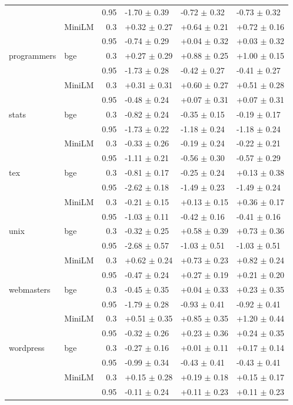\begin{tabular}{llrlll}
 &  & 0.95 & -1.70 $\pm$ 0.39 & -0.72 $\pm$ 0.32 & -0.73 $\pm$ 0.32\\
 & MiniLM & 0.3 & +0.32 $\pm$ 0.27 & +0.64 $\pm$ 0.21 & +0.72 $\pm$ 0.16\\
 &  & 0.95 & -0.74 $\pm$ 0.29 & +0.04 $\pm$ 0.32 & +0.03 $\pm$ 0.32\\
\addlinespace[1pt]
programmers & bge & 0.3 & +0.27 $\pm$ 0.29 & +0.88 $\pm$ 0.25 & +1.00 $\pm$ 0.15\\
 &  & 0.95 & -1.73 $\pm$ 0.28 & -0.42 $\pm$ 0.27 & -0.41 $\pm$ 0.27\\
 & MiniLM & 0.3 & +0.31 $\pm$ 0.31 & +0.60 $\pm$ 0.27 & +0.51 $\pm$ 0.28\\
 &  & 0.95 & -0.48 $\pm$ 0.24 & +0.07 $\pm$ 0.31 & +0.07 $\pm$ 0.31\\
\addlinespace[1pt]
stats & bge & 0.3 & -0.82 $\pm$ 0.24 & -0.35 $\pm$ 0.15 & -0.19 $\pm$ 0.17\\
 &  & 0.95 & -1.73 $\pm$ 0.22 & -1.18 $\pm$ 0.24 & -1.18 $\pm$ 0.24\\
 & MiniLM & 0.3 & -0.33 $\pm$ 0.26 & -0.19 $\pm$ 0.24 & -0.22 $\pm$ 0.21\\
 &  & 0.95 & -1.11 $\pm$ 0.21 & -0.56 $\pm$ 0.30 & -0.57 $\pm$ 0.29\\
\addlinespace[1pt]
tex & bge & 0.3 & -0.81 $\pm$ 0.17 & -0.25 $\pm$ 0.24 & +0.13 $\pm$ 0.38\\
 &  & 0.95 & -2.62 $\pm$ 0.18 & -1.49 $\pm$ 0.23 & -1.49 $\pm$ 0.24\\
 & MiniLM & 0.3 & -0.21 $\pm$ 0.15 & +0.13 $\pm$ 0.15 & +0.36 $\pm$ 0.17\\
 &  & 0.95 & -1.03 $\pm$ 0.11 & -0.42 $\pm$ 0.16 & -0.41 $\pm$ 0.16\\
\addlinespace[1pt]
unix & bge & 0.3 & -0.32 $\pm$ 0.25 & +0.58 $\pm$ 0.39 & +0.73 $\pm$ 0.36\\
 &  & 0.95 & -2.68 $\pm$ 0.57 & -1.03 $\pm$ 0.51 & -1.03 $\pm$ 0.51\\
 & MiniLM & 0.3 & +0.62 $\pm$ 0.24 & +0.73 $\pm$ 0.23 & +0.82 $\pm$ 0.24\\
 &  & 0.95 & -0.47 $\pm$ 0.24 & +0.27 $\pm$ 0.19 & +0.21 $\pm$ 0.20\\
\addlinespace[1pt]
webmasters & bge & 0.3 & -0.45 $\pm$ 0.35 & +0.04 $\pm$ 0.33 & +0.23 $\pm$ 0.35\\
 &  & 0.95 & -1.79 $\pm$ 0.28 & -0.93 $\pm$ 0.41 & -0.92 $\pm$ 0.41\\
 & MiniLM & 0.3 & +0.51 $\pm$ 0.35 & +0.85 $\pm$ 0.35 & +1.20 $\pm$ 0.44\\
 &  & 0.95 & -0.32 $\pm$ 0.26 & +0.23 $\pm$ 0.36 & +0.24 $\pm$ 0.35\\
\addlinespace[1pt]
wordpress & bge & 0.3 & -0.27 $\pm$ 0.16 & +0.01 $\pm$ 0.11 & +0.17 $\pm$ 0.14\\
 &  & 0.95 & -0.99 $\pm$ 0.34 & -0.43 $\pm$ 0.41 & -0.43 $\pm$ 0.41\\
 & MiniLM & 0.3 & +0.15 $\pm$ 0.28 & +0.19 $\pm$ 0.18 & +0.15 $\pm$ 0.17\\
 &  & 0.95 & -0.11 $\pm$ 0.24 & +0.11 $\pm$ 0.23 & +0.11 $\pm$ 0.23\\
\bottomrule\end{tabular}